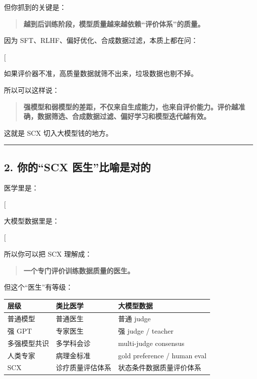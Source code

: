 \documentclass[
  12pt,
]{ctexart}
\begin{document}
但你抓到的关键是：

\begin{quote}
\textbf{越到后训练阶段，模型质量越来越依赖``评价体系''的质量。}
\end{quote}

因为 SFT、RLHF、偏好优化、合成数据过滤，本质上都在问：

{[} \text{这个回答好不好？这个样本值不值得训练？这个偏好判断可靠吗？}{]}

如果评价器不准，高质量数据就筛不出来，垃圾数据也剔不掉。

所以可以这样说：

\begin{quote}
\textbf{强模型和弱模型的差距，不仅来自生成能力，也来自评价能力。评价越准确，数据筛选、合成数据过滤、偏好学习和模型迭代越有效。}
\end{quote}

这就是 SCX 切入大模型钱的地方。

\begin{center}\rule{0.5\linewidth}{0.5pt}\end{center}

\subsection{2. 你的``SCX
医生''比喻是对的}\label{ux4f60ux7684scx-ux533bux751fux6bd4ux55bbux662fux5bf9ux7684}

医学里是：

{[}  \rightarrow {}
\rightarrow \text{高质量标签}{]}

大模型数据里是：

{[}  \rightarrow {}
\rightarrow \text{高质量训练数据}{]}

所以你可以把 SCX 理解成：

\begin{quote}
\textbf{一个专门评价训练数据质量的医生。}
\end{quote}

但这个``医生''有等级：

\begin{longtable}[]{@{}lll@{}}
\toprule\noalign{}
层级 & 类比医学 & 大模型数据 \\
\midrule\noalign{}
\endhead
\bottomrule\noalign{}
\endlastfoot
普通模型 & 普通医生 & 普通 judge \\
强 GPT & 专家医生 & 强 judge / teacher \\
多强模型共识 & 多学科会诊 & multi-judge consensus \\
人类专家 & 病理金标准 & gold preference / human eval \\
SCX & 诊疗质量评估体系 & 状态条件数据质量评价体系 \\
\end{longtable}
\end{document}
